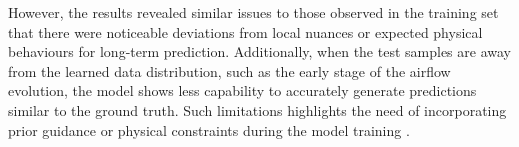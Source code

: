 \documentclass[final-report]{article-template}
\begin{document}
However, the results revealed similar issues to those observed in the training set that there were noticeable deviations from local nuances or expected physical behaviours for long-term prediction. Additionally, when the test samples are away from the learned data distribution, such as the early stage of the airflow evolution, the model shows less capability to accurately generate predictions similar to the ground truth. Such limitations highlights the need of incorporating prior guidance or physical constraints during the model training \cite{gao2024prediff, bian2024diffusion}.



\clearpage
\end{document}
